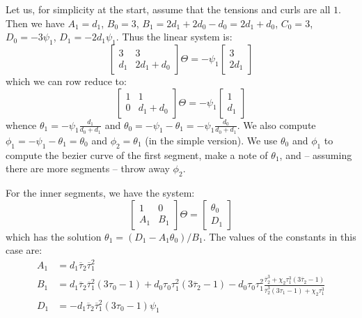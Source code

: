 \documentclass{article}
\begin{document}
Let us, for simplicity at the start, assume that the tensions and curls are all \(1\).
Then we have \(A_1 = d_1\), \(B_0 = 3\), \(B_1 = 2 d_1 + 2 d_0 - d_0 = 2 d_1 + d_0\), \(C_0 = 3\), \(D_0 = - 3 \psi_1\), \(D_1 = - 2 d_1 \psi_1\).
Thus the linear system is:
%
\[
  \begin{bmatrix}
  3 & 3 \\
  d_1 & 2 d_1 + d_0
  \end{bmatrix}
  \Theta = - \psi_1 \begin{bmatrix}
  3 \\ 2 d_1
  \end{bmatrix}
\]
%
which we can row reduce to:
%
\[
  \begin{bmatrix}
  1 & 1 \\
  0 & d_1 + d_0 
  \end{bmatrix}
  \Theta = -\psi_1 \begin{bmatrix}
  1 \\ d_1
  \end{bmatrix}
\]
%
whence \(\theta_1 = -\psi_1 \frac{d_1}{d_0 + d_1}\) and \(\theta_0 = -\psi_1 - \theta_1 = -\psi_1\frac{d_0 }{d_0 + d_1}\).
We also compute \(\phi_1 = -\psi_1 - \theta_1 = \theta_0\) and \(\phi_2 = \theta_1\) (in the simple version).
We use \(\theta_0\) and \(\phi_1\) to compute the bezier curve of the first segment, make a note of \(\theta_1\), and -- assuming there are more segments -- throw away \(\phi_2\).

For the inner segments, we have the system:
%
\[
  \begin{bmatrix}
  1 & 0 \\
  A_1 & B_1
  \end{bmatrix}
  \Theta = \begin{bmatrix}
  \theta_0 \\
  D_1
  \end{bmatrix}
\]
%
which has the solution \(\theta_1 = (D_1 - A_1 \theta_0)/B_1\).
The values of the constants in this case are:
%
\begin{align*}
A_1 &= d_1 \overline{\tau}_2 \overline{\tau}_1^2 \\
%
B_1 &= d_1 \overline{\tau}_2 \overline{\tau}_1^2 (3 \tau_0 - 1) + d_0 \tau_0 \tau_1^2(3 \overline{\tau}_2 - 1) - d_0 \tau_0 \tau_1^2 \frac{\overline{\tau}_2^3 + \chi_2 \tau_1^3 (3 \overline{\tau}_2 - 1)}{\overline{\tau}_2^3 (3 \tau_1 - 1) + \chi_2 \tau_1^3} \\
%
D_1 &= - d_1 \overline{\tau}_2 \overline{\tau}_1^2 (3 \tau_0 - 1) \psi_1
\end{align*}
\end{document}
